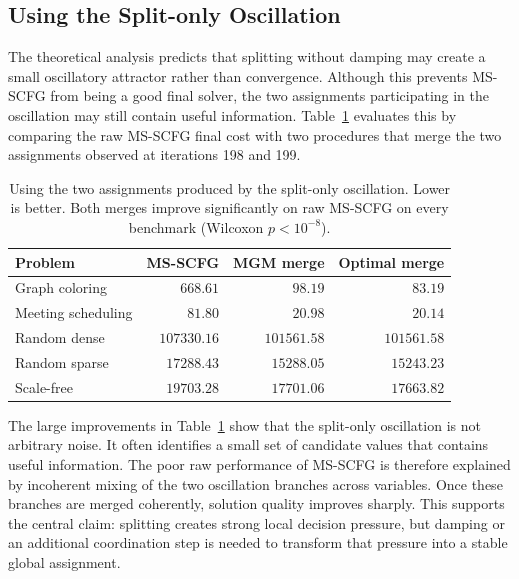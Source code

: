 \documentclass[letterpaper]{article} %
\theoremstyle{definition}
\theoremstyle{remark}
\begin{document}
\subsection{Using the Split-only Oscillation}
The theoretical analysis predicts that splitting without damping may create a
small oscillatory attractor rather than convergence.  Although this prevents
MS-SCFG from being a good final solver, the two assignments participating in
the oscillation may still contain useful information.  Table~\ref{tab:merge}
evaluates this by comparing the raw MS-SCFG final cost with two procedures
that merge the two assignments observed at iterations 198 and 199.
\begin{table}[t]
\centering
\caption{Using the two assignments produced by the split-only oscillation.
Lower is better.  Both merges improve significantly on raw MS-SCFG on every
benchmark (Wilcoxon $p < 10^{-8}$).}
\label{tab:merge}
\begin{tabular}{lrrr}
\toprule
\textbf{Problem}
& \textbf{MS-SCFG}
& \textbf{MGM merge}
& \textbf{Optimal merge} \\
\midrule
Graph coloring
& $668.61$
& $98.19$
& $83.19$ \\
Meeting scheduling
& $81.80$
& $20.98$
& $20.14$ \\
Random dense
& $107330.16$
& $101561.58$
& $101561.58$ \\
Random sparse
& $17288.43$
& $15288.05$
& $15243.23$ \\
Scale-free
& $19703.28$
& $17701.06$
& $17663.82$ \\
\bottomrule
\end{tabular}
\end{table}
The large improvements in Table~\ref{tab:merge} show that the split-only
oscillation is not arbitrary noise.  It often identifies a small set of candidate
values that contains useful information.  The poor raw performance of MS-SCFG
is therefore explained by incoherent mixing of the two oscillation branches
across variables.  Once these branches are merged coherently, solution quality
improves sharply.  This supports the central claim: splitting creates strong
local decision pressure, but damping or an additional coordination step is needed
to transform that pressure into a stable global assignment.
\end{document}
